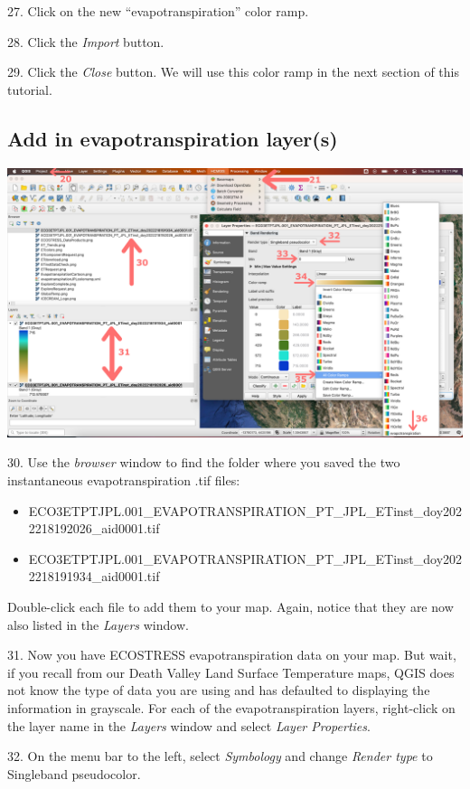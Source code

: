 \documentclass[oneside,a4paper,11pt,explicit]{book}
\begin{document}
27. Click on the new ``evapotranspiration'' color ramp.

28. Click the \textit{Import} button.

29. Click the \textit{Close} button. We will use this color ramp in the next section of this tutorial.

\subsection{Add in evapotranspiration layer(s)}

\centerline{\includegraphics[width=\textwidth]{ETmapping.png}}

30. Use the \textit{browser} window to find the folder where you saved the two instantaneous evapotranspiration .tif files: 
\begin{itemize}
	\item ECO3ETPTJPL.001\_EVAPOTRANSPIRATION\_PT\_JPL\_ETinst\_doy2022218192026\_aid0001.tif
	\item ECO3ETPTJPL.001\_EVAPOTRANSPIRATION\_PT\_JPL\_ETinst\_doy2022218191934\_aid0001.tif
\end{itemize}
Double-click each file to add them to your map. Again, notice that they are now also listed in the \textit{Layers} window.

31. Now you have ECOSTRESS evapotranspiration data on your map. But wait, if you recall from our Death Valley Land Surface Temperature maps, QGIS does not know the type of data you are using and has defaulted to displaying the information in grayscale. For each of the evapotranspiration layers, right-click on the layer name in the \textit{Layers} window and select \textit{Layer Properties}. 

32. On the menu bar to the left, select \textit{Symbology} and change \textit{Render type} to Singleband pseudocolor. 
\end{document}
